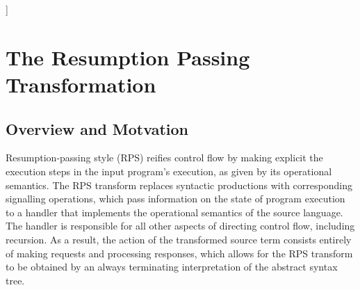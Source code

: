 \documentclass[a4paper,10pt]{article}
\begin{document}
]








\section{The Resumption Passing Transformation}

\subsection{Overview and Motvation}

Resumption-passing style (RPS) reifies control flow by making explicit the execution steps in the input program's execution, as given by its operational semantics.  The RPS transform replaces syntactic productions with corresponding signalling operations, which pass information on the state of program execution to a handler that implements the operational semantics of the source language.  The handler is responsible for all other aspects of directing control flow, including recursion.  As a result, the action of the transformed source term consists entirely of making requests and processing responses, which allows for the RPS transform to be obtained by an always terminating interpretation of the abstract syntax tree.\\
\end{document}
